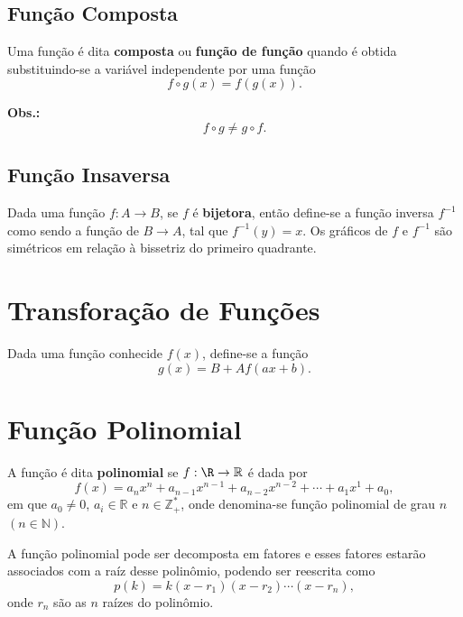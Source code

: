 		\subsection{Função Composta}
		\label{sec:função_composta}
		
		Uma função é dita \textbf{composta} ou \textbf{função de função} quando é obtida substituindo-se a variável independente por uma função \[
			f \circ g(x) = f(g(x))
		.\] 

		\textbf{Obs.:} \[
			f \circ g \neq g \circ f
		.\] 
		
		\subsection{Função Insaversa}
		\label{sec:função_inversa}
		
		Dada uma função $f:A \rightarrow B$, se $f$ é \textbf{bijetora}, então define-se a função inversa $f^{-1}$ como sendo a função de $B \rightarrow A$, tal que $f^{-1}(y) = x$. Os gráficos de $f$ e $f^{-1}$ são simétricos em relação à bissetriz do primeiro quadrante.

	\section{Transforação de Funções}
	\label{sec:transforação_de_funções}
	
	Dada uma função conhecide $f(x)$, define-se a função \[
		g(x) = B + Af(ax+b)
	.\] 

	\section{Função Polinomial}
	\label{sec:função_polinomial}
	
	A função é dita \textbf{polinomial} se $f:\R \rightarrow \mathbb{R}$ é dada por
	\begin{equation}
		f(x) = a_nx^{n} + a_{n-1}x^{n-1} + a_{n-2}x^{n-2} + \cdots + a_1x^{1} + a_0,
	\end{equation}
	em que $a_0 \neq 0$, $a_i \in \mathbb{R}$ e $n \in \mathbb{Z}_{+}^{*}$, onde denomina-se função polinomial de grau $n$ $(n \in \mathbb{N})$.
	
	A função polinomial pode ser decomposta em fatores e esses fatores estarão associados com a raíz desse polinômio, podendo ser reescrita como \[
		p(k) = k(x-r_1)(x-r_2) \cdots (x-r_n)
	,\] onde $r_n$ são as  $n$ raízes do polinômio.

